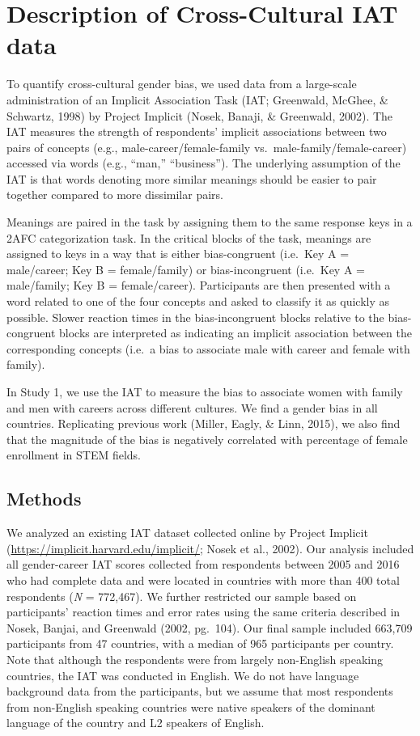 \documentclass[man]{apa6}
\theoremstyle{definition}
\theoremstyle{definition}
\theoremstyle{definition}
\theoremstyle{remark}
\begin{document}
\section{Description of Cross-Cultural IAT
data}\label{description-of-cross-cultural-iat-data}

To quantify cross-cultural gender bias, we used data from a large-scale
administration of an Implicit Association Task (IAT; Greenwald, McGhee,
\& Schwartz, 1998) by Project Implicit (Nosek, Banaji, \& Greenwald,
2002). The IAT measures the strength of respondents' implicit
associations between two pairs of concepts (e.g.,
male-career/female-family vs.~male-family/female-career) accessed via
words (e.g., \enquote{man,} \enquote{business}). The underlying
assumption of the IAT is that words denoting more similar meanings
should be easier to pair together compared to more dissimilar pairs.

Meanings are paired in the task by assigning them to the same response
keys in a 2AFC categorization task. In the critical blocks of the task,
meanings are assigned to keys in a way that is either bias-congruent
(i.e.~Key A = male/career; Key B = female/family) or bias-incongruent
(i.e.~Key A = male/family; Key B = female/career). Participants are then
presented with a word related to one of the four concepts and asked to
classify it as quickly as possible. Slower reaction times in the
bias-incongruent blocks relative to the bias-congruent blocks are
interpreted as indicating an implicit association between the
corresponding concepts (i.e.~a bias to associate male with career and
female with family).

In Study 1, we use the IAT to measure the bias to associate women with
family and men with careers across different cultures. We find a gender
bias in all countries. Replicating previous work (Miller, Eagly, \&
Linn, 2015), we also find that the magnitude of the bias is negatively
correlated with percentage of female enrollment in STEM fields.

\subsection{Methods}\label{methods}

We analyzed an existing IAT dataset collected online by Project Implicit
(\url{https://implicit.harvard.edu/implicit/}; Nosek et al., 2002). Our
analysis included all gender-career IAT scores collected from
respondents between 2005 and 2016 who had complete data and were located
in countries with more than 400 total respondents (\emph{N} = 772,467).
We further restricted our sample based on participants' reaction times
and error rates using the same criteria described in Nosek, Banjai, and
Greenwald (2002, pg.~104). Our final sample included 663,709
participants from 47 countries, with a median of 965 participants per
country. Note that although the respondents were from largely
non-English speaking countries, the IAT was conducted in English. We do
not have language background data from the participants, but we assume
that most respondents from non-English speaking countries were native
speakers of the dominant language of the country and L2 speakers of
English.
\end{document}

